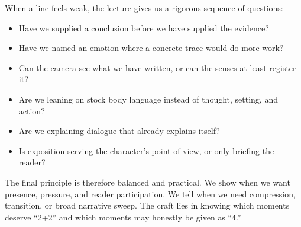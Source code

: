 When a line feels weak, the lecture gives us a rigorous sequence of questions:
\begin{itemize}
\item Have we supplied a conclusion before we have supplied the evidence?
\item Have we named an emotion where a concrete trace would do more work?
\item Can the camera see what we have written, or can the senses at least register it?
\item Are we leaning on stock body language instead of thought, setting, and action?
\item Are we explaining dialogue that already explains itself?
\item Is exposition serving the character's point of view, or only briefing the reader?
\end{itemize}

The final principle is therefore balanced and practical. We show when we want presence, pressure, and reader participation. We tell when we need compression, transition, or broad narrative sweep. The craft lies in knowing which moments deserve ``2+2'' and which moments may honestly be given as ``4.''